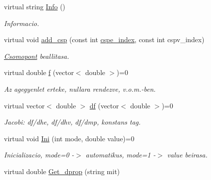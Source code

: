 \begin{DoxyCompactItemize}
virtual string \hyperlink{class_agelem_a2e6c4688cdbdf17c6d3bde0c6c08ff49}{Info} ()
\begin{DoxyCompactList}\small\item\em Informacio. \end{DoxyCompactList}\item 
\hypertarget{class_agelem_aa440ca95f0c0d27092f048f0c95cd998}{}\label{class_agelem_aa440ca95f0c0d27092f048f0c95cd998} 
virtual void \hyperlink{class_agelem_aa440ca95f0c0d27092f048f0c95cd998}{add\+\_\+csp} (const int \hyperlink{class_agelem_a9639c0a7a0165b644d62033e24eb6d24}{cspe\+\_\+index}, const int cspv\+\_\+index)
\begin{DoxyCompactList}\small\item\em \hyperlink{class_csomopont}{Csomopont} beallitasa. \end{DoxyCompactList}\item 
\hypertarget{class_agelem_aa1d93be52ddae11df003c4e35c47084b}{}\label{class_agelem_aa1d93be52ddae11df003c4e35c47084b} 
virtual double \hyperlink{class_agelem_aa1d93be52ddae11df003c4e35c47084b}{f} (vector$<$ double $>$)=0
\begin{DoxyCompactList}\small\item\em Az agegyenlet erteke, nullara rendezve, v.\+o.\+m.-\/ben. \end{DoxyCompactList}\item 
\hypertarget{class_agelem_a7934ea6320bdc37526ed3daa108ce1ed}{}\label{class_agelem_a7934ea6320bdc37526ed3daa108ce1ed} 
virtual vector$<$ double $>$ \hyperlink{class_agelem_a7934ea6320bdc37526ed3daa108ce1ed}{df} (vector$<$ double $>$)=0
\begin{DoxyCompactList}\small\item\em Jacobi\+: df/dhe, df/dhv, df/dmp, konstans tag. \end{DoxyCompactList}\item 
\hypertarget{class_agelem_a844171faf01143770bbd894b1a48e72f}{}\label{class_agelem_a844171faf01143770bbd894b1a48e72f} 
virtual void \hyperlink{class_agelem_a844171faf01143770bbd894b1a48e72f}{Ini} (int mode, double value)=0
\begin{DoxyCompactList}\small\item\em Inicializacio, mode=0 -\/$>$ automatikus, mode=1 -\/$>$ value beirasa. \end{DoxyCompactList}\item 
\hypertarget{class_agelem_ab808a928d9ebef901155b6b985370eb5}{}\label{class_agelem_ab808a928d9ebef901155b6b985370eb5} 
virtual double \hyperlink{class_agelem_ab808a928d9ebef901155b6b985370eb5}{Get\+\_\+dprop} (string mit)

\end{DoxyCompactItemize}
